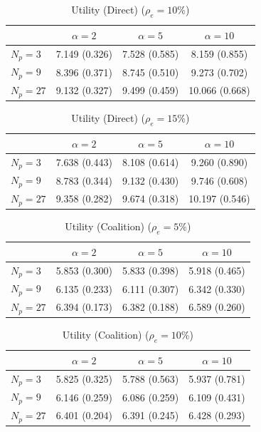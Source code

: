 \begin{table}[htbp]
\centering
\begin{tabular}{lccc}
\toprule
 & $\alpha=2$ & $\alpha=5$ & $\alpha=10$ \\
\midrule
$N_p=3$ & 7.149 (0.326) & 7.528 (0.585) & 8.159 (0.855) \\
$N_p=9$ & 8.396 (0.371) & 8.745 (0.510) & 9.273 (0.702) \\
$N_p=27$ & 9.132 (0.327) & 9.499 (0.459) & 10.066 (0.668) \\
\bottomrule
\end{tabular}
\caption{Utility (Direct) ($\rho_e=10\%$)}
\label{tab:exp2_avg_utility_gov_direct_rho10}
\end{table}


\begin{table}[htbp]
\centering
\begin{tabular}{lccc}
\toprule
 & $\alpha=2$ & $\alpha=5$ & $\alpha=10$ \\
\midrule
$N_p=3$ & 7.638 (0.443) & 8.108 (0.614) & 9.260 (0.890) \\
$N_p=9$ & 8.783 (0.344) & 9.132 (0.430) & 9.746 (0.608) \\
$N_p=27$ & 9.358 (0.282) & 9.674 (0.318) & 10.197 (0.546) \\
\bottomrule
\end{tabular}
\caption{Utility (Direct) ($\rho_e=15\%$)}
\label{tab:exp2_avg_utility_gov_direct_rho15}
\end{table}


\begin{table}[htbp]
\centering
\begin{tabular}{lccc}
\toprule
 & $\alpha=2$ & $\alpha=5$ & $\alpha=10$ \\
\midrule
$N_p=3$ & 5.853 (0.300) & 5.833 (0.398) & 5.918 (0.465) \\
$N_p=9$ & 6.135 (0.233) & 6.111 (0.307) & 6.342 (0.330) \\
$N_p=27$ & 6.394 (0.173) & 6.382 (0.188) & 6.589 (0.260) \\
\bottomrule
\end{tabular}
\caption{Utility (Coalition) ($\rho_e=5\%$)}
\label{tab:exp2_avg_utility_gov_coalition_rho5}
\end{table}


\begin{table}[htbp]
\centering
\begin{tabular}{lccc}
\toprule
 & $\alpha=2$ & $\alpha=5$ & $\alpha=10$ \\
\midrule
$N_p=3$ & 5.825 (0.325) & 5.788 (0.563) & 5.937 (0.781) \\
$N_p=9$ & 6.146 (0.259) & 6.086 (0.259) & 6.109 (0.431) \\
$N_p=27$ & 6.401 (0.204) & 6.391 (0.245) & 6.428 (0.293) \\
\bottomrule
\end{tabular}
\caption{Utility (Coalition) ($\rho_e=10\%$)}
\label{tab:exp2_avg_utility_gov_coalition_rho10}
\end{table}


